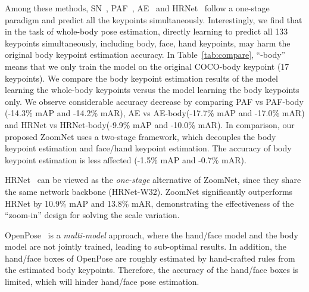 \documentclass[runningheads]{llncs}
\begin{document}
	Among these methods, SN~\cite{hidalgo2019single}, PAF~\cite{cao2017realtime}, AE~\cite{newell2017associative} and HRNet~\cite{sun2019deep} follow a one-stage paradigm and predict all the keypoints simultaneously. Interestingly, we find that in the task of whole-body pose estimation, directly learning to predict all 133 keypoints simultaneously, including body, face, hand keypoints, may harm the original body keypoint estimation accuracy. In Table~\ref{tab:compare}, ``-body'' means that we only train the model on the original COCO-body keypoint  (17 keypoints). We compare the body keypoint estimation results of the model learning the whole-body keypoints versus the model learning the body keypoints only. We observe considerable accuracy decrease by comparing PAF vs PAF-body (-14.3\% mAP and -14.2\% mAR), AE vs AE-body(-17.7\% mAP and -17.0\% mAR) and HRNet vs HRNet-body(-9.9\% mAP and -10.0\% mAR). In comparison, our proposed ZoomNet uses a two-stage framework, which decouples the body keypoint estimation and face/hand keypoint estimation. The accuracy of body keypoint estimation is less affected (-1.5\% mAP and -0.7\% mAR).
	
	HRNet~\cite{sun2019deep} can be viewed as the \emph{one-stage} alternative of ZoomNet, since they share the same network backbone (HRNet-W32). ZoomNet significantly outperforms HRNet by 10.9\% mAP and 13.8\% mAR, demonstrating the effectiveness of the ``zoom-in'' design for solving the scale variation.
	
	OpenPose~\cite{cao2018openpose} is a \emph{multi-model} approach, where the hand/face model and the body model are not jointly trained, leading to sub-optimal results. In addition, the hand/face boxes of OpenPose are roughly estimated by hand-crafted rules from the estimated body keypoints. Therefore, the accuracy of the hand/face boxes is limited, which will hinder hand/face pose estimation. 
	
\end{document}
